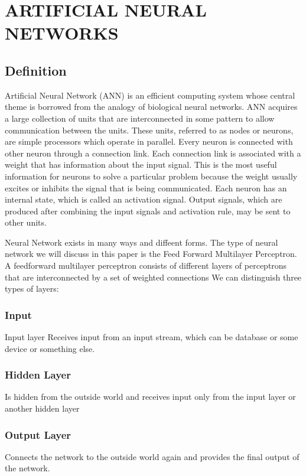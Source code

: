 \documentclass{report}
\begin{document}
\chapter{ARTIFICIAL NEURAL NETWORKS}
\section{Definition}
Artificial Neural Network (ANN) is an efficient computing system whose central theme is borrowed from the analogy of biological neural networks. ANN acquires a large collection of units that are interconnected in some pattern to allow communication between the units. These units, referred to as nodes or neurons, are simple processors which operate in parallel.
Every neuron is connected with other neuron through a connection link. Each connection link is associated with a weight that has information about the input signal. This is the most useful information for neurons to solve a particular problem because the weight usually excites or inhibits the signal that is being communicated. Each neuron has an internal state, which is called an activation signal. Output signals, which are produced after combining the input signals and activation rule, may be sent to other units.



Neural Network exists in many ways and diffeent forms. The type of neural network we will discuss in this paper is the Feed Forward Multilayer Perceptron. A feedforward multilayer perceptron consists of different layers of perceptrons that are interconnected by a set of weighted connections We can distinguish three types of layers:

\subsection{Input}
Input layer Receives input from an input stream, which can be database or some device or something else.

\subsection{Hidden Layer}
Is hidden from the outside world and receives input only from the input layer or another hidden layer

\subsection{Output Layer}
Connects the network to the outside world again and provides the final output of the network.
\end{document}
